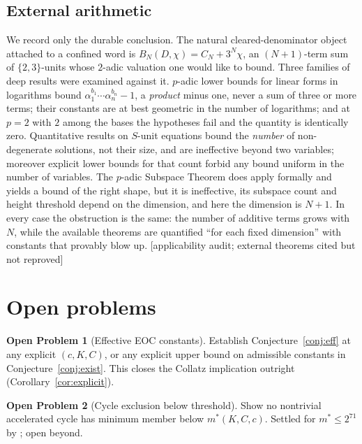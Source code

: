 \documentclass[11pt]{article}
\theoremstyle{plain}
\theoremstyle{definition}
\newtheorem{openproblem}{Open Problem}
\theoremstyle{remark}
\newcommand{\status}[1]{\textsf{\footnotesize[#1]}}
\begin{document}
\subsection{External arithmetic}\label{sec:external}

We record only the durable conclusion. The natural cleared-denominator object attached to a
confined word is $B_N(D,\chi)=C_N+3^N\chi$, an $(N{+}1)$-term sum of $\{2,3\}$-units whose
$2$-adic valuation one would like to bound. Three families of deep results were examined against
it. $p$-adic lower bounds for linear forms in logarithms bound $\alpha_1^{b_1}\cdots\alpha_n^{b_n}-1$,
a \emph{product} minus one, never a sum of three or more terms; their constants are at best
geometric in the number of logarithms; and at $p=2$ with $2$ among the bases the hypotheses fail
and the quantity is identically zero. Quantitative results on $S$-unit equations bound the
\emph{number} of non-degenerate solutions, not their size, and are ineffective beyond two
variables; moreover explicit lower bounds for that count forbid any bound uniform in the number of
variables. The $p$-adic Subspace Theorem does apply formally and yields a bound of the right shape,
but it is ineffective, its subspace count and height threshold depend on the dimension, and here
the dimension is $N{+}1$. In every case the obstruction is the same: the number of additive terms
grows with $N$, while the available theorems are quantified ``for each fixed dimension'' with
constants that provably blow up. \status{applicability audit; external theorems cited but not
reproved}

\section{Open problems}\label{sec:open}

\begin{openproblem}[Effective EOC constants]\label{op:A}
Establish Conjecture~\ref{conj:eff} at any explicit $(c,K,C)$, or any explicit upper bound on
admissible constants in Conjecture~\ref{conj:exist}. This closes the Collatz implication outright
(Corollary~\ref{cor:explicit}).
\end{openproblem}

\begin{openproblem}[Cycle exclusion below threshold]\label{op:B}
Show no nontrivial accelerated cycle has minimum member below $m^*(K,C,c)$. Settled for
$m^*\le2^{71}$ by \cite{Barina}; open beyond.
\end{openproblem}
\end{document}
